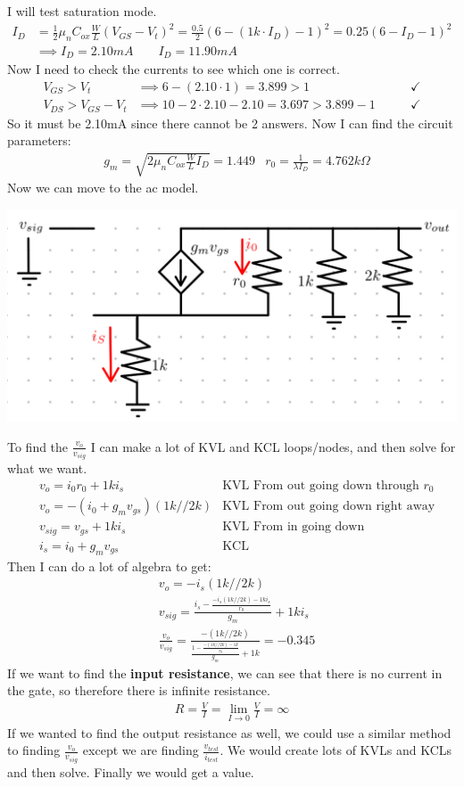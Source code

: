 \documentclass[12pt,letterpaper]{article} \usepackage{amsmath} \usepackage{graphicx} \usepackage[margin=1in]{geometry} \usepackage{longtable}  \usepackage{amssymb}
\begin{document}
\begin{mdframed}
		I will test saturation mode. 
		\begin{align*}
			I_D &= \frac{1}{2}\mu_n C_{ox} \frac{W}{L} (V_{GS} - V_t)^2 = \frac{0.5}{2}(6-(1k\cdot I_D)-1)^2 = 0.25(6-I_D-1)^2 \\ &\implies I_D=2.10mA \qquad I_D=11.90mA
		\end{align*}
		Now I need to check the currents to see which one is correct. 
		\begin{align*}
			V_{GS} > V_t &\implies 6-(2.10\cdot 1) = 3.899 > 1 \qquad &\checkmark \\
			V_{DS} > V_{GS} - V_t &\implies 10-2\cdot 2.10 - 2.10= 3.697 > 3.899-1 \qquad &\checkmark
		\end{align*}
		So it must be 2.10mA since there cannot be 2 answers. Now I can find the circuit parameters:
		\begin{align*}
			&g_m = \sqrt{2\mu_n C_{ox}\frac{W}{L} I_D} = 1.449 &r_0 = \frac{1}{\lambda I_D} = 4.762k\Omega
		\end{align*}
		Now we can move to the ac model. 
		\begin{center}
			\includegraphics[width=0.5\linewidth]{mosfet-ex1}
		\end{center}
		To find the $\frac{v_o}{v_{sig}}$ I can make a lot of KVL and KCL loops/nodes, and then solve for what we want. 
		\begin{align*}
			&v_o = i_0r_0+1k i_s&\text{KVL From out going down through $r_0$}\\
			&v_o = -(i_0 + g_m v_{gs})(1k//2k)&\text{KVL From out going down right away}\\
			&v_{sig} = v_{gs} + 1k i_s&\text{KVL From in going down}\\
			&i_s = i_0 + g_m v_{gs}&\text{KCL}
		\end{align*}
		Then I can do a lot of algebra to get:
		\begin{align*}
			&v_o = -i_s(1k//2k)\\
			&v_{sig} = \frac{i_s-\frac{-i_s (1k//2k)-1ki_s}{r_0}}{g_m} + 1k i_s\\
			&\frac{v_o}{v_{sig}} = \frac{-(1k//2k)}{\frac{1-\frac{-(1k//2k)-1k}{r_0}}{g_m} + 1k} = -0.345
		\end{align*}
		If we want to find the \textbf{input resistance}, we can see that there is no current in the gate, so therefore there is infinite resistance. 
		\begin{align*}
			R = \frac{V}{I} = \lim_{I\to 0} \frac{V}{I} = \infty
		\end{align*}
		If we wanted to find the output resistance as well, we could use a similar method to finding $\frac{v_o}{v_{sig}}$ except we are finding $\frac{v_{test}}{i_{test}}$. We would create lots of KVLs and KCLs and then solve. Finally we would get a value. 
		
		
	\end{mdframed}
	
\end{document}
